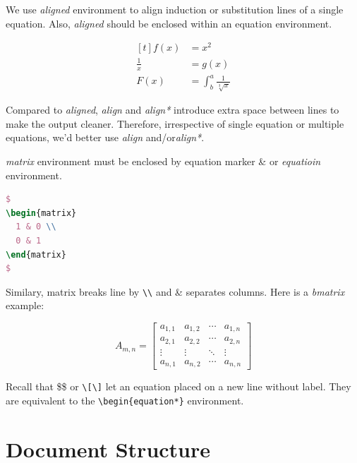 We use \textit{aligned} environment to align induction or
substitution lines of a single equation. Also, \textit{aligned}
should be enclosed within an equation environment.

\[
  \begin{aligned}[t]
    \label{eq:eq-alignment}
    f(x) &= x^2 \\
    \frac{1}{x} &= g(x) \\
    F(x) &= \int^a_b \frac{1}{\sqrt[3]{x}}
  \end{aligned}
\]

Compared to \textit{aligned}, \textit{align} and \textit{align*}
introduce extra space between lines to make the output
cleaner. Therefore, irrespective of single equation or multiple
equations, we'd better use \textit{align} and/or\textit{align*}.

\textit{matrix} environment must be enclosed by equation marker \&
or \textit{equatioin} environment.

\begin{lstlisting}[language=TeX,caption={Matrix},label={lst:matrix-marker}]
$
\begin{matrix}
  1 & 0 \\
  0 & 1
\end{matrix}
$
\end{lstlisting}

Similary, matrix breaks line by \verb|\\| and \& separates
columns. Here is a \textit{bmatrix} example:

\begin{equation}
  \label{eq:nn-matrix}
  A_{m,n} =
  \begin{bmatrix}
    a_{1,1} & a_{1,2} & \cdots & a_{1,n} \\
    a_{2,1} & a_{2,2} & \cdots & a_{2,n} \\
    \vdots & \vdots & \ddots & \vdots \\
    a_{n,1} & a_{n,2} & \cdots & a_{n,n}
  \end{bmatrix}  
\end{equation}

Recall that \$\$ or \verb|\[\]| let an equation placed on a new
line without label. They are equivalent to the
\verb|\begin{equation*}| environment.

\section{Document Structure}
\label{sec:file-structure}


